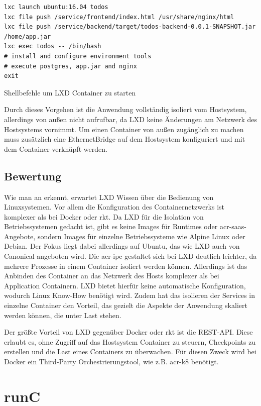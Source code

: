 \begin{listing}[h]
	\begin{verbatim}
lxc launch ubuntu:16.04 todos
lxc file push /service/frontend/index.html /usr/share/nginx/html
lxc file push /service/backend/target/todos-backend-0.0.1-SNAPSHOT.jar /home/app.jar
lxc exec todos -- /bin/bash
# install and configure environment tools
# execute postgres, app.jar and nginx
exit
	\end{verbatim}
	\caption{Shellbefehle um LXD Container zu starten}
	\label{lst:lxdConfig}
\end{listing}

Durch dieses Vorgehen ist die Anwendung vollständig isoliert vom Hostsystem, allerdings von außen nicht aufrufbar, da LXD keine Änderungen am Netzwerk des Hostsystems vornimmt. Um einen Container von außen zugänglich zu machen muss zusätzlich eine EthernetBridge auf dem Hostsystem konfiguriert und mit dem Container verknüpft werden.

\subsection{Bewertung}
\label{sec:compLXDBewertung}
Wie man an  erkennt, erwartet LXD Wissen über die Bedienung von Linuxsystemen. Vor allem die Konfiguration des Containernetzwerks ist komplexer als bei Docker oder rkt. Da LXD für die Isolation von Betriebssystemen gedacht ist, gibt es keine Images für Runtimes oder \gls{acr-saas}-Angebote, sondern Images für einzelne Betriebssysteme wie Alpine Linux oder Debian. Der Fokus liegt dabei allerdings auf Ubuntu, das wie LXD auch von Canonical angeboten wird. Die \gls{acr-ipc} gestaltet sich bei LXD deutlich leichter, da mehrere Prozesse in einem Container isoliert werden können. Allerdings ist das Anbinden des Container an das Netzwerk des Hosts komplexer als bei Application Containern. LXD bietet hierfür keine automatische Konfiguration, wodurch Linux Know-How benötigt wird. Zudem hat das isolieren der Services in einzelne Container den Vorteil, das gezielt die Aspekte der Anwendung skaliert werden können, die unter Last stehen.

Der größte Vorteil von LXD gegenüber Docker oder rkt ist die REST-API. Diese erlaubt es, ohne Zugriff auf das Hostsystem Container zu steuern, Checkpoints zu erstellen und die Last eines Containers zu überwachen. Für diesen Zweck wird bei Docker ein Third-Party Orchestrierungstool, wie z.B. \gls{acr-k8} benötigt.

\section{runC}
\label{sec:comprunC}

